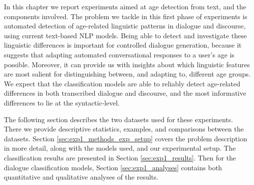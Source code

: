 

In this chapter we report experiments aimed at age detection from text, and the components involved. The problem we tackle in this first phase of experiments is automated detection of age-related linguistic patterns in dialogue and discourse, using current text-based NLP models. Being able to detect and investigate these linguistic differences is important for controlled dialogue generation, because it suggests that adapting automated conversational responses to a user's age is possible. Moreover, it can provide us with insights about which linguistic features are most salient for distinguishing between, and adapting to, different age groups. We expect that the classification models are able to reliably detect age-related differences in both transcribed dialogue and discourse, and the most informative differences to lie at the syntactic-level.

The following section describes the two datasets used for these experiments. There we provide descriptive statistics, examples, and comparisons between the datasets. Section \ref{sec:exp1_methods_exp_setup} covers the problem description in more detail, along with the models used, and our experimental setup. The classification results are presented in Section \ref{sec:exp1_results}. Then for the dialogue classification models, Section \ref{sec:exp1_analyses} contains both quantitative and qualitative analyses of the results.